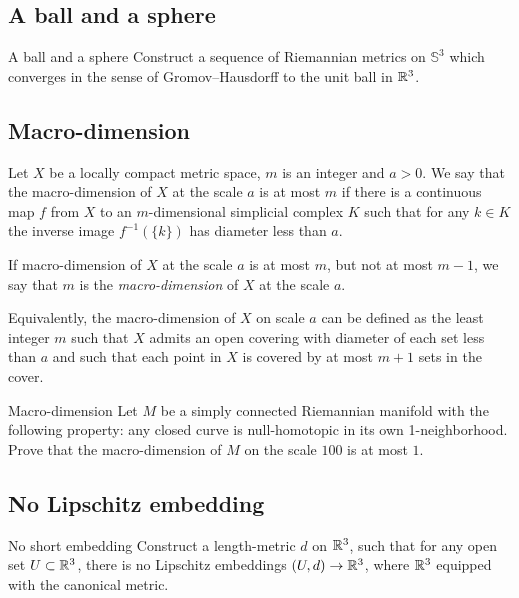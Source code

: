 \subsection*{A ball and a sphere}

\begin{pr}{}{A ball and a sphere}\label{3-sphere is close to a ball}
Construct a sequence of Riemannian metrics on $\mathbb{S}^3$ 
which converges in the sense of Gromov--Hausdorff 
to the unit ball in $\mathbb{R}^3$.
\end{pr}

\subsection*{Macro-dimension\easy}

Let $X$ be a locally compact metric space,
$m$ is an integer
and $a>0$.
We say that the macro-dimension  of $X$ at the scale $a$ is at most $m$
if there is a continuous map $f$ from $X$ to an $m$-dimensional simplicial complex $K$
such that for any $k\in K$ the inverse image $f^{-1}(\{k\})$ has diameter less than $a$.

If macro-dimension of $X$ at the scale $a$ is at most $m$,
but not at most $m-1$, 
we say that $m$ is the \emph{macro-dimension} of $X$ at the scale $a$.

Equivalently, the macro-dimension of $X$ on scale $a$ can be defined as 
the least integer $m$ such that $X$ admits an open covering with diameter of each set less than $a$ 
and such that each point in $X$ is covered by at most $m+1$ sets in the cover.

\begin{pr}{\easy}{Macro-dimension}\label{macro-dimension} 
Let $M$ be a simply connected Riemannian manifold with the following property: 
any closed curve is null-homotopic 
in its own  1-neighborhood. 
Prove that the macro-dimension of $M$ on the scale $100$ is at most $1$.
\end{pr}

\subsection*{No Lipschitz embedding\hard}

\begin{pr}{\hard}{No short embedding}\label{weird-metric} 
Construct a length-metric $d$ on $\mathbb{R}^3$,
such that for any open set $U\subset  \mathbb{R}^3$,
there is no Lipschitz embeddings $(U,d)\to \mathbb{R}^3$,
where $\mathbb{R}^3$ equipped with the canonical metric.
\end{pr}

